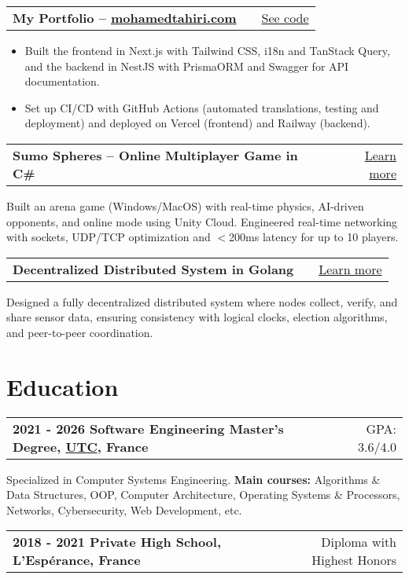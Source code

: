 \documentclass[a4paper,10pt]{article}
\makeatletter
\newenvironment{jobshort}[2]
    {
    \begin{tabularx}{\linewidth}{@{}l X r@{}}
    \textbf{#1} & \hfill &  #2 \\[3.75pt]
    \end{tabularx}
    } {}
\newenvironment{joblong}[2]
    {
    \begin{tabularx}{\linewidth}{@{}l X r@{}}
    \textbf{#1} & \hfill &  #2 \\[3.75pt]
    \end{tabularx}
    \begin{minipage}[t]{\linewidth}
    \begin{itemize}[nosep,after=\strut, leftmargin=1em, itemsep=3pt,label=--]
    }
    {
    \end{itemize}
    \end{minipage}    
    }
\makeatother
\begin{document}
\begin{joblong}{My Portfolio – \href{https://mohamedtahiri.com}{mohamedtahiri.com}}{\href{https://github.com/moha-tah/portfolio}{See code}}
    \item Built the frontend in Next.js with Tailwind CSS, i18n and TanStack Query, and the backend in NestJS with PrismaORM and Swagger for API documentation.
    \item Set up CI/CD with GitHub Actions (automated translations, testing and deployment) and deployed on Vercel (frontend) and Railway (backend).
\end{joblong}

\begin{jobshort}{Sumo Spheres – Online Multiplayer Game in C\#}{\href{https://mohamedtahiri.com/projects/online-multiplayer-game}{Learn more}}
    Built an arena game (Windows/MacOS) with real-time physics, AI-driven opponents, and online mode using Unity Cloud. Engineered real-time networking with sockets, UDP/TCP optimization and $<$200ms latency for up to 10 players.
\end{jobshort}

\begin{jobshort}{Decentralized Distributed System in Golang}{\href{https://mohamedtahiri.com/projects/decentralized-distributed-system}{Learn more}}
    Designed a fully decentralized distributed system where nodes collect, verify, and share sensor data, ensuring consistency with logical clocks, election algorithms, and peer-to-peer coordination.
\end{jobshort}

\section{Education}

\begin{jobshort}{2021 - 2026    Software Engineering Master's Degree, \href{https://www.utc.fr}{UTC}, France}{GPA: 3.6/4.0}
    Specialized in Computer Systems Engineering. \textbf{Main courses:} Algorithms \& Data Structures, OOP, Computer Architecture, Operating Systems \& Processors, Networks, Cybersecurity, Web Development, etc.
\end{jobshort}

\begin{jobshort}{2018 - 2021    Private High School, L'Espérance, France}{Diploma with Highest Honors}
\end{jobshort}
\end{document}
